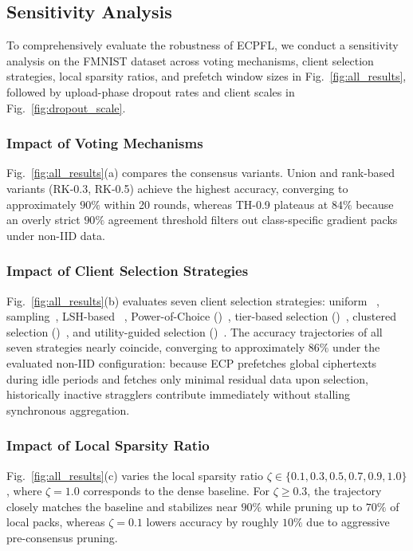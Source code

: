 \subsection{Sensitivity Analysis}
\label{sec:sensitivity}

To comprehensively evaluate the robustness of \textsc{ECPFL}, we conduct a sensitivity analysis on the FMNIST dataset across voting mechanisms, client selection strategies, local sparsity ratios, and prefetch window sizes in Fig.~\ref{fig:all_results}, followed by upload-phase dropout rates and client scales in Fig.~\ref{fig:dropout_scale}.

\subsubsection{Impact of Voting Mechanisms}
Fig.~\ref{fig:all_results}(a) compares the consensus variants. Union and rank-based variants (\textsc{RK-0.3}, \textsc{RK-0.5}) achieve the highest accuracy, converging to approximately $90\%$ within 20 rounds, whereas \textsc{TH-0.9} plateaus at $84\%$ because an overly strict $90\%$ agreement threshold filters out class-specific gradient packs under non-IID data. 

\subsubsection{Impact of Client Selection Strategies}
Fig.~\ref{fig:all_results}(b) evaluates seven client selection strategies: uniform ~\cite{mcmahan2017communication},  sampling~\cite{he2023gluefl}, LSH-based ~\cite{li2025fedphe}, Power-of-Choice ()~\cite{cho2022towards}, tier-based selection ()~\cite{chai2020tifl}, clustered selection ()~\cite{wolfrath2022haccs}, and utility-guided selection ()~\cite{lai2021oort}. The accuracy trajectories of all seven strategies nearly coincide, converging to approximately $86\%$ under the evaluated non-IID configuration: because ECP prefetches global ciphertexts during idle periods and fetches only minimal residual data upon selection, historically inactive stragglers contribute immediately without stalling synchronous aggregation.


\subsubsection{Impact of Local Sparsity Ratio}
Fig.~\ref{fig:all_results}(c) varies the local sparsity ratio $\zeta \in \{0.1, 0.3, 0.5, 0.7, 0.9, 1.0\}$, where $\zeta=1.0$ corresponds to the dense baseline. For $\zeta \ge 0.3$, the trajectory closely matches the baseline and stabilizes near $90\%$ while pruning up to $70\%$ of local packs, whereas $\zeta=0.1$ lowers accuracy by roughly $10\%$ due to aggressive pre-consensus pruning. 

